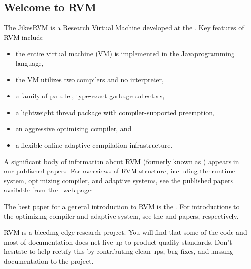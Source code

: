 \subsection {Welcome to RVM}

The Jikes\JikesTMFootnote RVM is a Research Virtual Machine 
 developed at the 
.  Key
features of RVM include
\begin{itemize}
\item the entire virtual machine (VM) is implemented in the
  Java\JavaTMFootnote  programming language,
\item the VM utilizes two compilers and no interpreter,
\item a family of parallel, type-exact garbage collectors,
\item a lightweight thread package with compiler-supported preemption,
\item an aggressive optimizing compiler, and 
\item a flexible online adaptive compilation infrastructure.
\end{itemize}

A significant body of information about RVM 
(formerly known as 
\xlink{\jp}{\JalapenoHomeURL}) appears 
in our published
papers.  For overviews of RVM structure, including the runtime system,
optimizing compiler, and adaptive systems, see the published papers
available from the \jrvm\ web page:
\begin{quote}
\xlink{{\RVMPubsURL}}{\RVMPubsURL}
\end{quote}

The best paper for a general introduction to RVM is 
the 
.  
For introductions to the
optimizing compiler and adaptive system, see the 
{\JavaGrandePaperURL}
 and 
{\OOPSLAPaperURL}  
papers, respectively.

RVM is a bleeding-edge research project.  You will find that
some of the code and most of documentation does not live up to product  
quality standards. Don't hesitate to help rectify this by
contributing clean-ups, bug fixes, and missing documentation to 
the project.  


